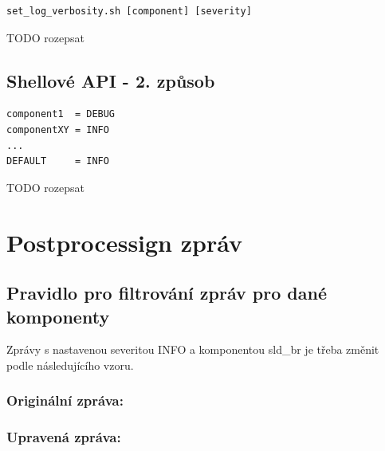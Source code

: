 \documentclass[thesis=B,czech]{FITthesis}[2012/06/26]
\begin{document}
\begin{scriptsize}
\begin{verbatim}
set_log_verbosity.sh [component] [severity]
\end{verbatim}
\end{scriptsize}

TODO rozepsat

\subsection*{Shellové API - 2. způsob}

\begin{scriptsize}
\begin{verbatim}
/etc/logging.conf
\end{verbatim}}
\end{scriptsize}

\begin{scriptsize}
\begin{verbatim}
component1  = DEBUG
componentXY = INFO
...
DEFAULT     = INFO
\end{verbatim}
\end{scriptsize}

TODO rozepsat

\section{Postprocessign zpráv}

\subsection{Pravidlo pro filtrování zpráv pro dané komponenty}
Zprávy s nastavenou severitou INFO a komponentou sld\_br je třeba změnit podle následujícího vzoru.

\subsubsection*{Originální zpráva:}
\begin{scriptsize}
\begin{verbatim}
2016-02-18T14:05:24+01:00 cc-b8-f1-00-6f-07 sld_br: id=559 
:[stbhal.cpp:debug:520]: INFO: [94mDEBUG: InformationService:
 Reading 'nangu.video.forcedScart': false[0m
\end{verbatim}}
\end{scriptsize}

\subsubsection*{Upravená zpráva:}
\begin{scriptsize}
\begin{verbatim}
2016-02-18T14:05:24+01:00 cc-b8-f1-00-6f-07 nangu-portal: [94m InformationService:
 Reading 'nangu.video.forcedScart': false[0m
\end{verbatim}}
\end{scriptsize}
\end{document}
